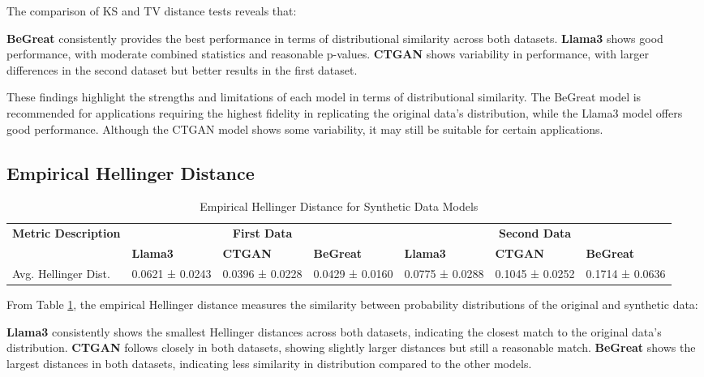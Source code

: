 The comparison of KS and TV distance tests reveals that:

\textbf{BeGreat} consistently provides the best performance in terms of distributional similarity across both datasets.
\textbf{Llama3} shows good performance, with moderate combined statistics and reasonable p-values.
\textbf{CTGAN} shows variability in performance, with larger differences in the second dataset but better results in the first dataset.

\vspace{0.5cm}

These findings highlight the strengths and limitations of each model in terms of distributional similarity. The BeGreat model is recommended for applications requiring the highest fidelity in replicating the original data's distribution, while the Llama3 model offers good performance. Although the CTGAN model shows some variability, it may still be suitable for certain applications.






\subsection{Empirical Hellinger Distance}


\begin{table}[H]
\centering
\caption{Empirical Hellinger Distance for Synthetic Data Models}
\label{tab:hellinger_distance_combined}
\begin{tabularx}{\textwidth}{l*{6}{X}}
    \toprule
    \textbf{Metric Description} & \multicolumn{3}{c}{\textbf{First Data}} & \multicolumn{3}{c}{\textbf{Second Data}} \\
    \cmidrule(lr){2-4} \cmidrule(lr){5-7}
    & \textbf{Llama3} & \textbf{CTGAN} & \textbf{BeGreat} & \textbf{Llama3} & \textbf{CTGAN} & \textbf{BeGreat} \\
    \midrule
    Avg. Hellinger Dist. & 0.0621 ± 0.0243 & 0.0396 ± 0.0228 & 0.0429 ± 0.0160 & 0.0775 ± 0.0288 & 0.1045 ± 0.0252 & 0.1714 ± 0.0636 \\
    \bottomrule
\end{tabularx}
\end{table}



From Table \ref{tab:hellinger_distance_combined}, the empirical Hellinger distance measures the similarity between probability distributions of the original and synthetic data:

\textbf{Llama3} consistently shows the smallest Hellinger distances across both datasets, indicating the closest match to the original data's distribution.
\textbf{CTGAN} follows closely in both datasets, showing slightly larger distances but still a reasonable match.
\textbf{BeGreat} shows the largest distances in both datasets, indicating less similarity in distribution compared to the other models.

